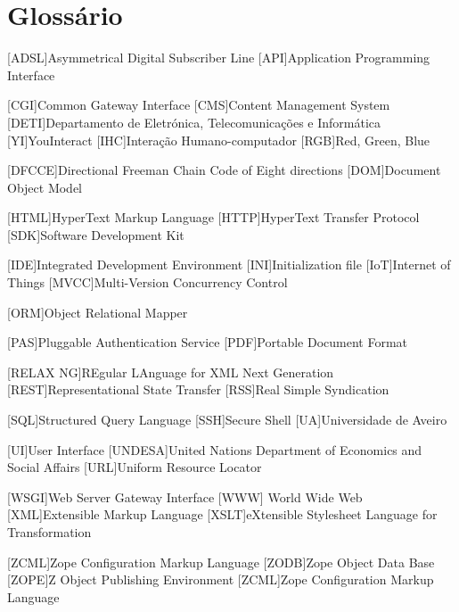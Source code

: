 \chapter*{Glossário}
	\begin{acronym}[RELAX NG]
		
		{Asymmetrical Digital Subscriber Line}
		[API]{Application Programming Interface}
		
		[CGI]{Common Gateway Interface}
		[CMS]{Content Management System}
		{Departamento de Eletrónica, Telecomunicações e Informática  }
		[YI]{YouInteract}		
		[IHC]{Interação Humano-computador}	
        [RGB]{Red, Green, Blue}
        
		[DFCCE]{Directional Freeman Chain Code of Eight directions}
		[DOM]{Document Object Model}
		
		{HyperText Markup Language}
		{HyperText Transfer Protocol}		
		[SDK]{Software Development Kit}
        
        
		[IDE]{Integrated Development Environment}
		[INI]{Initialization file}	
		[IoT]{Internet of Things}			
		{Multi-Version Concurrency Control}		

		[ORM]{Object Relational Mapper}
		
		[PAS]{Pluggable Authentication Service}
		[PDF]{Portable Document Format}
		
		[RELAX NG]{REgular LAnguage for XML Next Generation}
		{Representational State Transfer}
		[RSS]{Real Simple Syndication}
		
		[SQL]{Structured Query Language}		
		[SSH]{Secure Shell}
		[UA]{Universidade de Aveiro}
        
		[UI]{User Interface}
		[UNDESA]{United Nations Department of Economics and Social Affairs}
		[URL]{Uniform Resource Locator}
		
		{Web Server Gateway Interface}
		[WWW]{ World Wide Web}
		[XML]{Extensible Markup Language}
		{eXtensible Stylesheet Language for Transformation}
		
		{Zope Configuration Markup Language}
		{Zope Object Data Base}
		{Z Object Publishing Environment}
		{Zope Configuration Markup Language}
	\end{acronym}